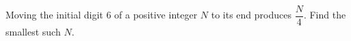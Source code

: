 Moving the initial digit 6 of a positive integer $ N $ to its end produces $\dfrac{N}{4}$. Find the smallest such $ N $.
